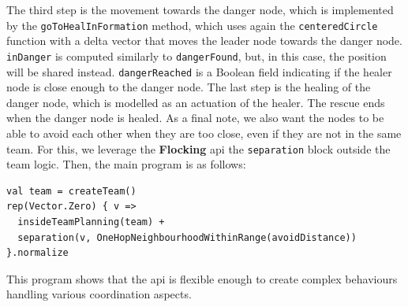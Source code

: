 %
The third step is the movement towards the danger node, 
 which is implemented by the \lstinline|goToHealInFormation| method, 
 which uses again the \lstinline|centeredCircle| function
 with a delta vector that moves the leader node towards the danger node.
\lstinline|inDanger| is computed similarly to \lstinline|dangerFound|, 
 but, in this case, the position will be shared instead. 
 \lstinline|dangerReached| is a Boolean field indicating if the healer node is close enough to the danger node.
The last step is the healing of the danger node, which is modelled as an actuation of the healer. 
 The rescue ends when the danger node is healed.
As a final note, we also want the nodes to be able to avoid 
 each other when they are too close, even if they are not in the same team.
 For this, we leverage the \textbf{Flocking} \ac{api} the \texttt{separation} block outside the team logic.
Then, the main program is as follows:
\begin{lstlisting}
val team = createTeam()
rep(Vector.Zero) { v =>
  insideTeamPlanning(team) + 
  separation(v, OneHopNeighbourhoodWithinRange(avoidDistance))
}.normalize
\end{lstlisting}
This program shows that the \ac{api} 
 is flexible enough to create complex behaviours handling various coordination aspects.
